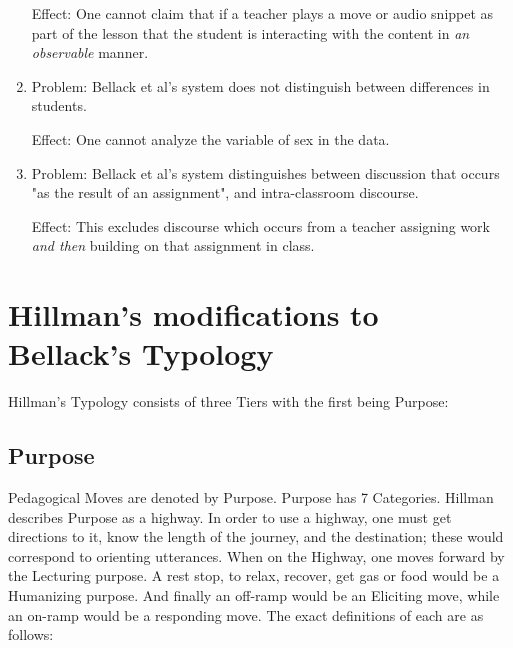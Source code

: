 \documentclass[10pt, letterpaper]{article}
\begin{document}
\begin{enumerate}
Effect: One cannot claim that if a teacher plays a move or audio snippet
as part of the lesson that the student is interacting with the content in
\emph{an observable} manner.
\item Problem: Bellack et al's system does not distinguish between differences
in students.

Effect: One cannot analyze the variable of sex in the data.
\item Problem: Bellack et al's system distinguishes between discussion that
occurs "as the result of an assignment", and intra-classroom discourse.

Effect: This excludes discourse which occurs from a teacher assigning work
\emph{and then} building on that assignment in class.
\end{enumerate}

\section*{Hillman's modifications to Bellack's Typology}
\label{sec:org7f63dee}
Hillman's Typology consists of three Tiers with the first being Purpose:
\subsection*{Purpose}
\label{sec:orged32213}
Pedagogical Moves are denoted by Purpose. Purpose has 7 Categories. Hillman
describes Purpose as a highway. In order to use a highway, one must get
directions to it, know the length of the journey, and the destination; these
would correspond to orienting utterances. When on the Highway, one moves
forward by the Lecturing purpose. A rest stop, to relax, recover, get gas or
food would be a Humanizing purpose. And finally an off-ramp would be an
Eliciting move, while an on-ramp would be a responding move. The exact
definitions of each are as follows:
\end{document}
